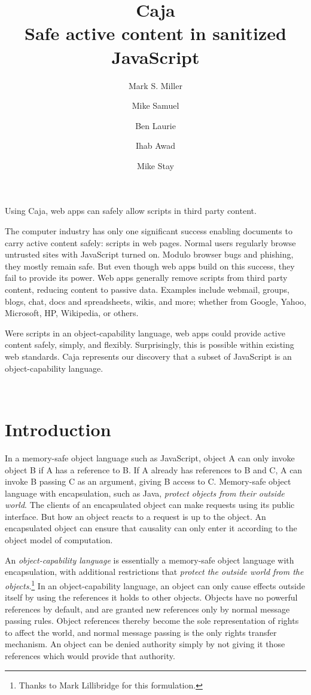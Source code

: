 \documentclass[letterpaper,twocolumn,10pt]{article}
\title{Caja\\
Safe active content in sanitized JavaScript}
\author{
        {\rm Mark S. Miller}
        \and 
        {\rm Mike Samuel}
        \and 
        {\rm Ben Laurie}
        \and 
        {\rm Ihab Awad}
        \and 
        {\rm Mike Stay}}
\begin{document}
\maketitle


\abstract

Using Caja, web apps can safely allow scripts in third party content.

The computer industry has only one significant success enabling documents to 
carry active content safely: scripts in web pages. Normal users regularly 
browse untrusted sites with JavaScript turned on. Modulo browser bugs and 
phishing, they mostly remain safe. But even though web apps build on this 
success, they fail to provide its power. Web apps generally remove scripts 
from third party content, reducing content to passive data. Examples include 
webmail, groups, blogs, chat, docs and spreadsheets, wikis, and more; whether 
from Google, Yahoo, Microsoft, HP, Wikipedia, or others.

Were scripts in an object-capability language, web apps could provide active 
content safely, simply, and flexibly. Surprisingly, this is possible within 
existing web standards. Caja represents our discovery that a subset of 
JavaScript is an object-capability language.

\ \\

\section{Introduction}

In a memory-safe object language such as JavaScript, object A can only invoke 
object B if A has a reference to B. If A already has references to B and C, A 
can invoke B passing C as an argument, giving B access to C. Memory-safe 
object language with encapsulation, such as Java, \emph{protect objects from 
their outside world}. The clients of an encapsulated object can make requests 
using its public interface. But how an object reacts to a request is up to 
the object. An encapsulated object can ensure that causality can only enter 
it according to the object model of computation.

An \emph{object-capability language} is essentially a memory-safe object 
language with encapsulation, with additional restrictions that \emph{protect 
the outside world from the objects}.\footnote{
%
Thanks to Mark Lillibridge for this formulation.
%
} In an object-capability language, an object can only cause effects outside 
itself by using the references it holds to other objects. Objects have no 
powerful references by default, and are granted new references only by normal 
message passing rules. Object references thereby become the sole 
representation of rights to affect the world, and normal message passing is 
the only rights transfer mechanism. An object can be denied authority simply 
by not giving it those references which would provide that authority.
\end{document}
